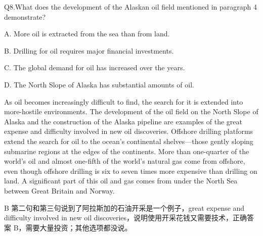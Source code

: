 \begin{blk}
    \begin{qst}
        Q8.What does the development of the Alaskan oil field mentioned in paragraph 4 demonstrate?
    \end{qst}

    \begin{chc}
        A. More oil is extracted from the sea than from land.

        B. Drilling for oil requires major financial investments.

        C. The global demand for oil has increased over the years.

        D. The North Slope of Alaska has substantial amounts of oil.
    \end{chc}

    \begin{psgq}
        As oil becomes increasingly difficult to find, the search for it is extended into more-hostile environments. The development of the oil field on the North Slope of Alaska and the construction of the Alaska pipeline are examples of the great expense and difficulty involved in new oil discoveries. Offshore drilling platforms extend the search for oil to the ocean’s continental shelves—those gently sloping submarine regions at the edges of the continents. More than one-quarter of the world’s oil and almost one-fifth of the world’s natural gas come from offshore, even though offshore drilling is six to seven times more expensive than drilling on land. A significant part of this oil and gas comes from under the North Sea between Great Britain and Norway.
    \end{psgq}

    \begin{nlz}
        B 第二句和第三句说到了阿拉斯加的石油开采是一个例子，great expense and difficulty involved in new oil discoveries，说明使用开采花钱又需要技术，正确答案 B，需要大量投资；其他选项都没说。
    \end{nlz}
\end{blk}


